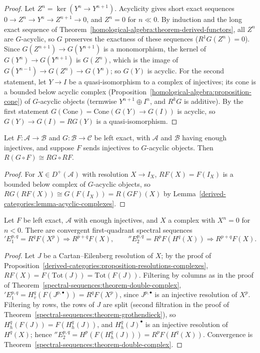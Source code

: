 \begin{proof}
Let $Z^n = \ker(Y^n \to Y^{n+1})$. Acyclicity gives short exact sequences $0 \to Z^n \to Y^n \to Z^{n+1} \to 0$, and $Z^n = 0$ for $n \ll 0$. By induction
and the long exact sequence of Theorem~\ref{homological-algebra:theorem-derived-functors}, all $Z^n$ are $G$-acyclic, so $G$ preserves the
exactness of these sequences ($R^1G(Z^n) = 0$). Since $G(Z^{n+1}) \to G(Y^{n+1})$ is a monomorphism, the kernel of $G(Y^n) \to G(Y^{n+1})$ is
$G(Z^n)$, which is the image of $G(Y^{n-1}) \to G(Z^n) \to G(Y^n)$; so $G(Y)$ is acyclic. For the second statement, let $Y \to I$ be a quasi-isomorphism to a complex of
injectives; its cone is a bounded below acyclic complex (Proposition~\ref{homological-algebra:proposition-cone}) of $G$-acyclic objects
(termwise $Y^{n+1} \oplus I^n$, and $R^kG$ is additive). By the first statement $G(\mathrm{Cone}) = \mathrm{Cone}(G(Y) \to G(I))$ is acyclic, so
$G(Y) \to G(I) = RG(Y)$ is a quasi-isomorphism.
\end{proof}

\begin{theorem}\label{derived-categories:theorem-composition}
Let $F \colon \mathcal{A} \to \mathcal{B}$ and $G \colon \mathcal{B} \to \mathcal{C}$ be left exact, with $\mathcal{A}$ and $\mathcal{B}$ having enough injectives,
and suppose $F$ sends injectives to $G$-acyclic objects. Then $R(G \circ F) \cong RG \circ RF$.
\end{theorem}

\begin{proof}
For $X \in D^+(\mathcal{A})$ with resolution $X \to I_X$, $RF(X) = F(I_X)$ is a bounded below complex of $G$-acyclic objects, so
$RG(RF(X)) \cong G(F(I_X)) = R(GF)(X)$ by Lemma~\ref{derived-categories:lemma-acyclic-complexes}.
\end{proof}

\begin{proposition}\label{derived-categories:proposition-hypercohomology}
Let $F$ be left exact, $\mathcal{A}$ with enough injectives, and $X$ a complex with $X^n = 0$ for $n < 0$. There are convergent first-quadrant
spectral sequences
\[
{}'E_1^{p,q} = R^qF(X^p) \Rightarrow R^{p+q}F(X), \qquad {}''E_2^{p,q} = R^pF(H^q(X)) \Rightarrow R^{p+q}F(X).
\]
\end{proposition}

\begin{proof}
Let $J$ be a Cartan--Eilenberg resolution of $X$; by the proof of Proposition~\ref{derived-categories:proposition-resolutions-complexes},
$RF(X) = F(\mathrm{Tot}(J)) = \mathrm{Tot}(F(J))$. Filtering by columns as in the proof of Theorem~\ref{spectral-sequences:theorem-double-complex},
${}'E_1^{p,q} = H^q_v(F(J^{p,\bullet})) = R^qF(X^p)$, since $J^{p,\bullet}$ is an injective resolution of $X^p$. Filtering by rows, the rows of $J$ are split
(second filtration in the proof of Theorem~\ref{spectral-sequences:theorem-grothendieck}), so $H^q_h(F(J)) = F(H^q_h(J))$, and $H^q_h(J)^{\bullet}$ is
an injective resolution of $H^q(X)$; hence ${}''E_2^{p,q} = H^p(F(H^q_h(J))) = R^pF(H^q(X))$. Convergence is
Theorem~\ref{spectral-sequences:theorem-double-complex}.
\end{proof}

